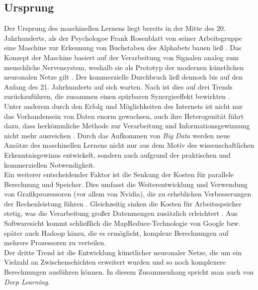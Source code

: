 \documentclass[german,bachelor]{swsLeipzig}
\begin{document}
\subsection{Ursprung}
Der Ursprung des maschinellen Lernens liegt bereits in der Mitte des 20. Jahrhunderts, als der Psychologoe Frank Rosenblatt
von seiner Arbeitsgruppe eine Maschine zur Erkennung von Buchstaben des Alphabets bauen ließ \cite[S. 1385]{FRADKOV20201385}.
Das Konzept der Maschine basiert auf der Verarbeitung von Signalen analog zum menschliche Nervensystem, weshalb sie
als Prototyp der modernen künstlichen neuronalen Netze gilt \cite[S. 1385]{FRADKOV20201385}.
Der kommerzielle Durchbruch ließ dennoch bis auf den Anfang des 21. Jahrhunderts auf sich warten.
Nach \citeauthor{FRADKOV20201385} ist dies auf drei Trends zurückzuführen, die zusammen einen spürbaren Synergieeffekt bewirkten \cite[S. 1387]{FRADKOV20201385}. \\

Unter anderem durch den Erfolg und Möglichkeiten des Internets ist nicht nur das Vorhandensein von Daten enorm gewachsen,
auch ihre Heterogenität führt dazu, dass herkömmliche Methode zur Verarbeitung und Informationsgewinnung nicht mehr ausreichen \cite[S. 1387]{FRADKOV20201385}.
Durch das Aufkommen von \textit{Big Data} werden neue Ansätze des maschinellen Lernens nicht nur aus dem Motiv des wissenschaftlichen Erkenntnisgewinns entwickelt,
sondern auch aufgrund der praktischen und kommerziellen Notwendigkeit. \\

Ein weiterer entscheidender Faktor ist die Senkung der Kosten für parallele Berechnung und Speicher.
Dies umfasst die Weiterentwicklung und Verwendung von Grafikprozessoren (vor allem von Nvidia),
die zu erheblichen Verbesserungen der Rechenleistung führen \cite[S. 1387]{FRADKOV20201385}.
Gleichzeitig sinken die Kosten für Arbeitsspeicher stetig, was die Verarbeitung großer Datenmengen zusätzlich erleichtert \cite[S. 1387]{FRADKOV20201385}.
Aus Softwaresicht kommt schließlich die MapReduce-Technologie von Google bzw. später auch Hadoop hinzu, die es ermöglicht,
komplexe Berechnungen auf mehrere Prozessoren zu verteilen\cite[S. 1387]{FRADKOV20201385}. \\

Der dritte Trend ist die Entwicklung künstlicher neuronaler Netze, die um ein Vielzahl an Zwischenschichten erweitert wurden
und so noch komplexere Berechnungen ausführen können.
In diesem Zusammenhang spricht man auch von \textit{Deep Learning}. \\
\end{document}
